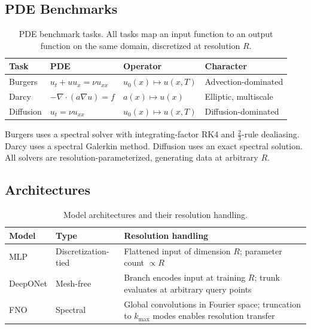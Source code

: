 \documentclass[11pt]{article}
\begin{document}
\subsection{PDE Benchmarks}

\begin{table}[h]
\centering
\caption{PDE benchmark tasks. All tasks map an input function to an
output function on the same domain, discretized at resolution $R$.}
\label{tab:tasks}
\begin{tabular}{@{}llll@{}}
\toprule
\textbf{Task} & \textbf{PDE} & \textbf{Operator} & \textbf{Character} \\
\midrule
Burgers & $u_t + u u_x = \nu u_{xx}$ &
  $u_0(x) \mapsto u(x, T)$ & Advection-dominated \\
Darcy & $-\nabla \cdot (a \nabla u) = f$ &
  $a(x) \mapsto u(x)$ & Elliptic, multiscale \\
Diffusion & $u_t = \nu u_{xx}$ &
  $u_0(x) \mapsto u(x, T)$ & Diffusion-dominated \\
\bottomrule
\end{tabular}
\end{table}

\noindent
Burgers uses a spectral solver with integrating-factor RK4 and
$\frac{2}{3}$-rule dealiasing. Darcy uses a spectral Galerkin method.
Diffusion uses an exact spectral solution. All solvers are
resolution-parameterized, generating data at arbitrary $R$.

\subsection{Architectures}

\begin{table}[h]
\centering
\caption{Model architectures and their resolution handling.}
\label{tab:models}
\begin{tabular}{@{}llp{7cm}@{}}
\toprule
\textbf{Model} & \textbf{Type} & \textbf{Resolution handling} \\
\midrule
MLP & Discretization-tied &
  Flattened input of dimension $R$; parameter count $\propto R$ \\
DeepONet & Mesh-free &
  Branch encodes input at training $R$; trunk evaluates at arbitrary
  query points \\
FNO & Spectral &
  Global convolutions in Fourier space; truncation to $k_{\max}$ modes
  enables resolution transfer \\
\bottomrule
\end{tabular}
\end{table}
\end{document}
